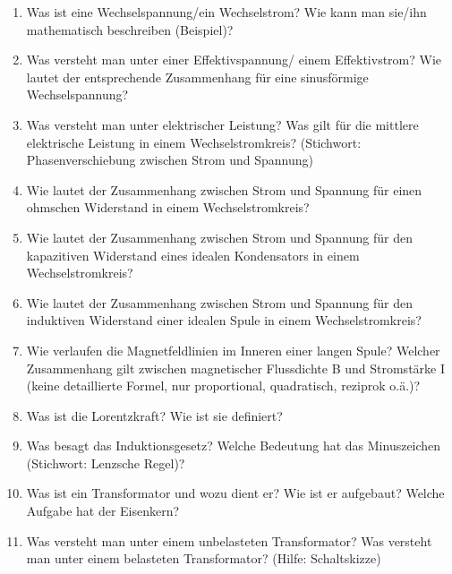 \begin{enumerate}
	\item Was ist eine Wechselspannung/ein Wechselstrom? Wie kann man sie/ihn mathematisch beschreiben (Beispiel)?
	\item Was versteht man unter einer Effektivspannung/ einem Effektivstrom? Wie lautet der entsprechende Zusammenhang für eine sinusförmige Wechselspannung?
	\item Was versteht man unter elektrischer Leistung? Was gilt für die mittlere elektrische Leistung in einem Wechselstromkreis? (Stichwort: Phasenverschiebung zwischen Strom und Spannung)
	\item Wie lautet der Zusammenhang zwischen Strom und Spannung für einen ohmschen Widerstand in einem Wechselstromkreis?
	\item Wie lautet der Zusammenhang zwischen Strom und Spannung für den kapazitiven Widerstand eines idealen Kondensators in einem Wechselstromkreis?
	\item Wie lautet der Zusammenhang zwischen Strom und Spannung für den induktiven Widerstand einer idealen Spule in einem Wechselstromkreis?
	\item Wie verlaufen die Magnetfeldlinien im Inneren einer langen Spule? Welcher Zusammenhang gilt zwischen magnetischer Flussdichte B und Stromstärke I (keine detaillierte Formel, nur proportional, quadratisch, reziprok o.ä.)?
	\item Was ist die Lorentzkraft? Wie ist sie definiert?
	\item Was besagt das Induktionsgesetz? Welche Bedeutung hat das Minuszeichen (Stichwort: Lenzsche Regel)?
	\item Was ist ein Transformator und wozu dient er? Wie ist er aufgebaut? Welche Aufgabe hat der Eisenkern?
	\item Was versteht man unter einem unbelasteten Transformator? Was versteht man unter einem belasteten Transformator? (Hilfe: Schaltskizze)
\end{enumerate}

